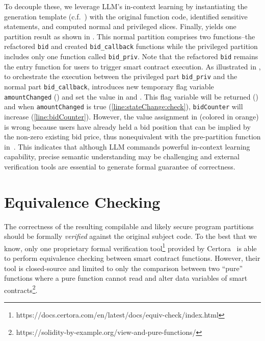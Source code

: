 \color{black}{}To decouple these, we leverage LLM's in-context learning by instantiating the generation template (c.f.~) with the original function code, identified sensitive statements, and computed normal and privileged slices.
Finally, \tool yields one partition result as shown in .
This normal partition comprises two functions--the refactored \texttt{bid} and created \texttt{bid\_callback} functions while the privileged partition includes only one function called \texttt{bid\_priv}.
Note that the refactored \texttt{bid} remains the entry function for users to trigger smart contract execution.
As illustrated in ,   
to orchestrate the execution between the privileged part \texttt{bid\_priv} and the normal part \texttt{bid\_callback},
\tool introduces new temporary flag variable \texttt{amountChanged} () and set the value in  and .
This flag variable will be returned () and when \texttt{amountChanged} is true (\cref{line:stateChange:check}), \texttt{bidCounter} will increase (\cref{line:bidCounter}).
However, the value assignment in  (colored in \textcolor{academicred}{orange}) is wrong because users have already held a bid position that can be implied by the non-zero existing bid price, thus nonequivalent with the pre-partition function in~. 
This indicates that although LLM commands powerful in-context learning capability, precise semantic understanding may be challenging and external verification tools are essential to generate formal guarantee of correctness. 



\section{Equivalence Checking}
\label{sec:verification}
The correctness of the resulting compilable and likely secure program partitions should be formally \emph{verified} against the original subject code. 
To the best that we know, only one proprietary formal verification tool\footnote{https://docs.certora.com/en/latest/docs/equiv-check/index.html} provided by Certora~\cite{Certora} is able to perform equivalence checking between smart contract functions.
However, their tool is closed-source and limited to only the comparison between two ``pure'' functions where a pure function cannot read and alter data variables of smart contracts\footnote{https://solidity-by-example.org/view-and-pure-functions/}.

